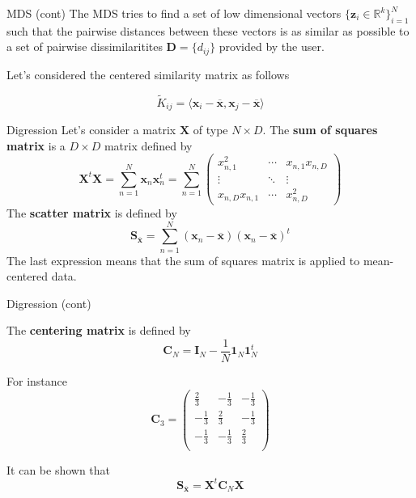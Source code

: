 \documentclass{beamer}
\begin{document}
\begin{frame}{MDS (cont)}
	The MDS tries to find a set of low dimensional vectors $\{ \textbf{z}_i \in \mathbb{R}^k\}_{i=1}^N$ such that the pairwise distances between these vectors is as similar as possible to a set of pairwise dissimilaritites $\textbf{D}=\{d_{ij}\}$ provided by the user. 

Let's considered the centered similarity matrix as follows

\begin{equation*}
	\tilde{K}_{ij}= \langle \textbf{x}_i - \overline{\textbf{x}}, \textbf{x}_j - \overline{\textbf{x}} \rangle
\end{equation*}
\end{frame}

\begin{frame}{Digression}
	Let's consider a matrix $\textbf{X}$ of type $N\times D$. The \textbf{sum of squares matrix}
	is a $D\times D$ matrix defined by
	\begin{equation*}
		\textbf{X}^t \textbf{X}=\sum_{n=1}^{N} \textbf{x}_n \textbf{x}_n^t=\sum_{n=1}^N 
		\begin{pmatrix}
			x_{n,1}^2 & \cdots & x_{n,1}x_{n,D}\\
			\vdots & \ddots & \vdots \\
			x_{n,D}x_{n,1}&\cdots & x_{n,D}^2
		\end{pmatrix}
	\end{equation*} 
	The \textbf{scatter matrix} is defined by
	\begin{equation*}
		\textbf{S}_{\overline{\textbf{x}}}= \sum_{n=1}^{N} 
		(\textbf{x}_n -\overline{\textbf{x}})
		(\textbf{x}_n -\overline{\textbf{x}})^t
	\end{equation*}
	The last expression means that the sum of squares matrix is applied to mean-centered data.
\end{frame}
\begin{frame}{Digression (cont)}
	
	The \textbf{centering matrix} is defined by
	\begin{equation*}
		\textbf{C}_N = \textbf{I}_N - \frac{1}{N} \textbf{1}_N \textbf{1}_N^t
	\end{equation*}
	
	For instance 
	\begin{equation*}
		\textbf{C}_3 = \begin{pmatrix}
			\frac{2}{3} & -\frac{1}{3} & -\frac{1}{3} \\
			-\frac{1}{3} & \frac{2}{3} & -\frac{1}{3} \\
				-\frac{1}{3} & -\frac{1}{3} & \frac{2}{3} \\	
		\end{pmatrix}
	\end{equation*}
	
	It can be shown that 
	\begin{equation*}
		\textbf{S}_{\overline{\textbf{x}}}= \textbf{X}^t\textbf{C}_N\textbf{X}
	\end{equation*}
\end{frame}
\end{document}
